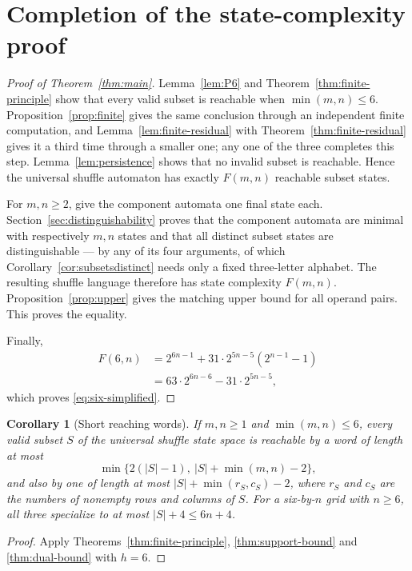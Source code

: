 \documentclass[11pt,letterpaper]{article}
\numberwithin{equation}{section}
\newtheorem{corollary}[theorem]{Corollary}
\theoremstyle{definition}
\theoremstyle{remark}
\begin{document}
\section{Completion of the state-complexity proof}
\label{sec:completion}

\begin{proof}[Proof of Theorem~\ref{thm:main}]
Lemma~\ref{lem:P6} and Theorem~\ref{thm:finite-principle} show that every
valid subset is reachable when $\min(m,n)\le6$. Proposition~\ref{prop:finite}
gives the same conclusion through an independent finite computation, and
Lemma~\ref{lem:finite-residual} with Theorem~\ref{thm:finite-residual} gives
it a third time through a smaller one; any one of the three completes this
step. Lemma~\ref{lem:persistence} shows that no invalid subset is reachable.
Hence the universal shuffle automaton has exactly $F(m,n)$ reachable subset
states.

For $m,n\ge2$, give the component automata one final state each.
Section~\ref{sec:distinguishability} proves that the component automata are
minimal with respectively $m,n$ states and that all distinct subset states
are distinguishable --- by any of its four arguments, of which
Corollary~\ref{cor:subsetsdistinct} needs only a fixed three-letter alphabet.
The resulting shuffle language therefore has state complexity $F(m,n)$.
Proposition~\ref{prop:upper} gives the matching upper bound for all operand
pairs. This proves the equality.

Finally,
\begin{align*}
 F(6,n)
 &=2^{6n-1}+31\cdot2^{5n-5}(2^{n-1}-1)\\
 &=63\cdot2^{6n-6}-31\cdot2^{5n-5},
\end{align*}
which proves \eqref{eq:six-simplified}.
\end{proof}

\begin{corollary}[Short reaching words]\label{cor:words}
If $m,n\ge1$ and $\min(m,n)\le6$, every valid subset $S$ of the universal
shuffle state space is reachable by a word of length at most
\[
 \min\bigl\{2(|S|-1),\ |S|+\min(m,n)-2\bigr\},
\]
and also by one of length at most $|S|+\min(r_S,c_S)-2$, where $r_S$ and
$c_S$ are the numbers of nonempty rows and columns of $S$. For a six-by-$n$
grid with $n\ge6$, all three specialize to at most $|S|+4\le6n+4$.
\end{corollary}
\begin{proof}
Apply Theorems~\ref{thm:finite-principle}, \ref{thm:support-bound} and
\ref{thm:dual-bound} with $h=6$.
\end{proof}
\end{document}
